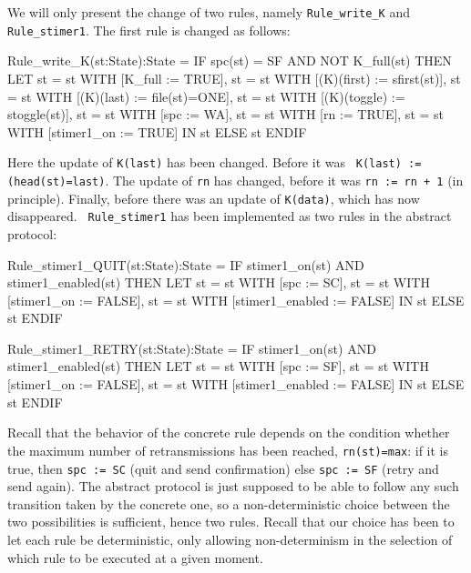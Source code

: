 We will only present the change of two rules, namely {\tt Rule\_write\_K} and
{\tt Rule\_stimer1}. The first rule is changed as follows:

\begin{smallsession}
  Rule_write_K(st:State):State =
    IF spc(st) = SF AND NOT K_full(st) THEN 
      LET 
        st = st WITH [K_full := TRUE],
        st = st WITH [(K)(first) := sfirst(st)],
        st = st WITH [(K)(last) := file(st)=ONE],
        st = st WITH [(K)(toggle) := stoggle(st)],
        st = st WITH [spc := WA],
        st = st WITH [rn := TRUE],
        st = st WITH [stimer1_on := TRUE]
      IN st
    ELSE 
      st
    ENDIF
\end{smallsession}

Here the update of {\tt K(last)} has  been changed. Before it was {\tt
K(last) := (head(st)=last)}. The update of {\tt rn} has changed, before
it was {\tt rn := rn + 1} (in principle).  Finally, before there was an
update   of  {\tt  K(data)},    which   has  now disappeared.     {\tt
Rule\_stimer1}   has been implemented  as two  rules   in the abstract
protocol:

\begin{smallsession}
  Rule_stimer1_QUIT(st:State):State =
    IF stimer1_on(st) AND stimer1_enabled(st) THEN
      LET 
        st = st WITH [spc := SC],
        st = st WITH [stimer1_on := FALSE],
        st = st WITH [stimer1_enabled := FALSE]
      IN st
    ELSE 
      st
    ENDIF

  Rule_stimer1_RETRY(st:State):State =
    IF stimer1_on(st) AND stimer1_enabled(st) THEN
      LET 
        st = st WITH [spc := SF],
        st = st WITH [stimer1_on := FALSE],
        st = st WITH [stimer1_enabled := FALSE]
      IN st
    ELSE 
      st
    ENDIF
\end{smallsession}

Recall that  the  behavior  of the    concrete  rule depends  on  the
condition whether  the   maximum number of  retransmissions   has been
reached, {\tt rn(st)=max}: if it is  true, then {\tt  spc := SC} (quit
and send  confirmation)   else {\tt  spc  :=   SF}  (retry   and  send
again).  The abstract protocol  is just supposed  to be able to follow
any such transition taken by  the concrete one, so a non-deterministic
choice between the two possibilities  is sufficient, hence two  rules.
Recall that our  choice  has been to  let  each rule  be deterministic,
only allowing non-determinism   in the selection  of which  rule to be
executed at a given moment.

